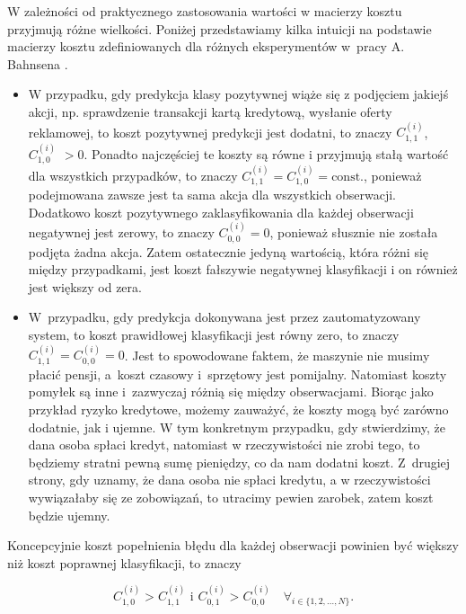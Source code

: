 \documentclass[inzynierska]{pwr_wmat_praca_dyplomowa}
\theoremstyle{plain}
\numberwithin{theorem}{chapter}
\theoremstyle{definition}
\numberwithin{theorem}{chapter}
\begin{document}
W zależności od praktycznego zastosowania wartości w macierzy kosztu przyjmują różne wielkości. Poniżej przedstawiamy kilka intuicji na podstawie macierzy kosztu zdefiniowanych dla różnych eksperymentów w~pracy A. Bahnsena \cite{alej2015ensemble}.
\begin{itemize}
	\item W przypadku, gdy predykcja klasy pozytywnej wiąże się z podjęciem jakiejś akcji, np. sprawdzenie transakcji kartą kredytową, wysłanie oferty reklamowej, to koszt pozytywnej predykcji jest dodatni, to znaczy $C^{(i)}_{1,1}$, $C^{(i)}_{1,0}$ $>0$. Ponadto najczęściej te koszty są równe i przyjmują stałą wartość dla wszystkich przypadków, to znaczy $C^{(i)}_{1,1} = C^{(i)}_{1,0} =  \text{const.}$, ponieważ podejmowana zawsze jest ta sama akcja dla wszystkich obserwacji. Dodatkowo koszt pozytywnego zaklasyfikowania dla każdej obserwacji negatywnej jest zerowy, to znaczy $C^{(i)}_{0,0} = 0$, ponieważ słusznie nie została podjęta żadna akcja. Zatem ostatecznie jedyną wartością, która różni się między przypadkami, jest koszt fałszywie negatywnej klasyfikacji i on również jest większy od zera.
	\item W~przypadku, gdy predykcja dokonywana jest przez zautomatyzowany system, to koszt prawidłowej klasyfikacji jest równy zero, to znaczy $C^{(i)}_{1,1} = C^{(i)}_{0,0} = 0$. Jest to spowodowane faktem, że maszynie nie musimy płacić pensji, a~koszt czasowy i~sprzętowy jest pomijalny. Natomiast koszty pomyłek są inne i~zazwyczaj różnią się między obserwacjami. Biorąc jako przykład ryzyko kredytowe, możemy zauważyć, że koszty mogą być zarówno dodatnie, jak i ujemne. W tym konkretnym przypadku, gdy stwierdzimy, że dana osoba spłaci kredyt, natomiast w rzeczywistości nie zrobi tego, to będziemy stratni pewną sumę pieniędzy, co da nam dodatni koszt. Z~drugiej strony, gdy uznamy, że dana osoba nie spłaci kredytu, a w rzeczywistości wywiązałaby się ze zobowiązań, to utracimy pewien zarobek, zatem koszt będzie ujemny.
\end{itemize}

Koncepcyjnie koszt popełnienia błędu dla każdej obserwacji powinien być większy niż koszt poprawnej klasyfikacji, to znaczy

$$ C^{(i)}_{1,0} > C^{(i)}_{1,1} \text{ i } C^{(i)}_{0,1} > C^{(i)}_{0,0} \quad \forall_{i \in \{1, 2, \dots, N\}} \text{.}$$
\end{document}
